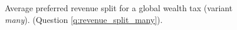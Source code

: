 \begin{figure}[h!]
    \caption[Average preferred revenue split (\textit{many})]{Average preferred revenue split for a global wealth tax (variant \textit{many}). (Question \ref{q:revenue_split_many}).
    }\label{fig:split_many_global_mean}
\end{figure} 




